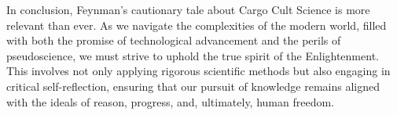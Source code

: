 In conclusion, Feynman’s cautionary tale about Cargo Cult Science is more
relevant than ever. As we navigate the complexities of the modern world, filled
with both the promise of technological advancement and the perils of
pseudoscience, we must strive to uphold the true spirit of the Enlightenment.
This involves not only applying rigorous scientific methods but also engaging
in critical self-reflection, ensuring that our pursuit of knowledge remains
aligned with the ideals of reason, progress, and, ultimately, human freedom.
